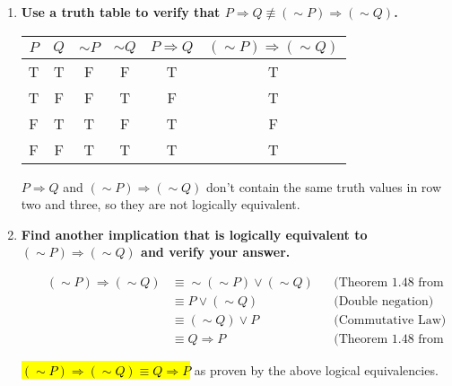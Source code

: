 \documentclass[10pt]{article}
\begin{document}
\begin{enumerate}[label=(\alph*)]

    \item \textbf{Use a truth table to verify that $P \Rightarrow Q \not\equiv 
        (\sim P) \Rightarrow (\sim Q)$.}

    \begin{table}[ht]
        \centering
        \begin{tabular}{|c|c|c|c|c|c|}

            \hline
            $P$ & $Q$ & $\sim P$ & $\sim Q$ & $P \Rightarrow Q$ & 
            $(\sim P) \Rightarrow (\sim Q)$ \\
            \hline
            \hline
            T & T & F & F & \cellcolor[gray]{0.8} T & \cellcolor[gray]{0.8} T \\
            \hline
            T & F & F & T & \cellcolor[rgb]{1,0,0} F & \cellcolor[rgb]{1,0,0} T \\
            \hline
            F & T & T & F & \cellcolor[rgb]{1,0,0} T & \cellcolor[rgb]{1,0,0} F \\
            \hline
            F & F & T & T & \cellcolor[gray]{0.8} T & \cellcolor[gray]{0.8} T \\
            \hline

        \end{tabular}
    \end{table}

    $P \Rightarrow Q$ and $(\sim P) \Rightarrow (\sim Q)$ don't contain the same
    truth values in row two and three, so they are not logically equivalent.

    \item \textbf{Find another implication that is logically equivalent to
        $(\sim P) \Rightarrow (\sim Q)$ and verify your answer.}

    \begin{align*}
        && (\sim P) \Rightarrow (\sim Q) &\equiv \sim(\sim P) \vee (\sim Q) && 
        \text{(Theorem 1.48 from textbook and 3a of HW)} \\
        && &\equiv P \vee (\sim Q) && \text{(Double negation)} \\
        && &\equiv (\sim Q) \vee P && \text{(Commutative Law)} \\
        && &\equiv Q \Rightarrow P && \text{(Theorem 1.48 from textbook again)}
    \end{align*}

    \hl{$(\sim P) \Rightarrow (\sim Q) \equiv Q \Rightarrow P$} as proven by the 
    above logical equivalencies.

\end{enumerate}
\end{document}
